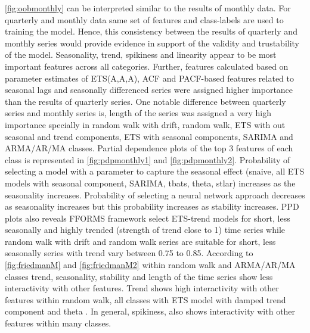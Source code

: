\documentclass[11pt,a4paper,]{article}
\theoremstyle{definition}
\theoremstyle{definition}
\theoremstyle{definition}
\theoremstyle{remark}
\begin{document}
\autoref{fig:oobmonthly} can be interpreted similar to the results of
monthly data. For quarterly and monthly data same set of features and
class-labels are used to training the model. Hence, this consistency
between the results of quarterly and monthly series would provide
evidence in support of the validity and trustability of the model.
Seasonality, trend, spikiness and linearity appear to be most important
features across all categories. Further, features calculated based on
parameter estimates of ETS(A,A,A), ACF and PACF-based features related
to seasonal lags and seasonally differenced series were assigned higher
importance than the results of quarterly series. One notable difference
between quarterly series and monthly series is, length of the series was
assigned a very high importance specially in random walk with drift,
random walk, ETS with out seasonal and trend components, ETS with
seasonal components, SARIMA and ARMA/AR/MA classes. Partial dependence
plots of the top 3 features of each class is represented in
\autoref{fig:pdpmonthly1} and \autoref{fig:pdpmonthly2}. Probability of
selecting a model with a parameter to capture the seasonal effect
(snaive, all ETS models with seasonal component, SARIMA, tbats, theta,
stlar) increases as the seasonality increases. Probability of selecting
a neural network approach decreases as seasonality increases but this
probability increases as stability increases. PPD plots also reveals
FFORMS framework select ETS-trend models for short, less seasonally and
highly trended (strength of trend close to 1) time series while random
walk with drift and random walk series are suitable for short, less
seasonally series with trend vary between 0.75 to 0.85. According to
\autoref{fig:friedmanM} and \autoref{fig:friedmanM2} within random walk
and ARMA/AR/MA classes trend, seasonality, stability and length of the
time series show less interactivity with other features. Trend shows
high interactivity with other features within random walk, all classes
with ETS model with damped trend component and theta . In general,
spikiness, also shows interactivity with other features within many
classes.

\clearpage
\end{document}
